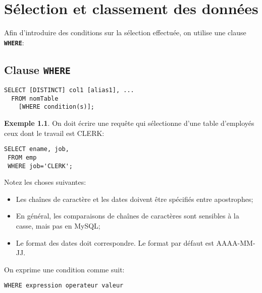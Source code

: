 \documentclass[a4paper, 12pt]{report}
\newcommand{\textSQL}[1]{\texttt{\textbf{#1}}}
\theoremstyle{definition} \newtheorem{ex}{Exemple}
\begin{document}
\chapter{Sélection et classement des données}
Afin d'introduire des conditions sur la sélection effectuée, on utilise une clause \textSQL{WHERE}:
\section{Clause \textSQL{WHERE}}
\begin{lstlisting}[frame=single]
SELECT [DISTINCT] col1 [alias1], ...
  FROM nomTable
	[WHERE condition(s)];
\end{lstlisting}

\begin{ex}
On doit écrire une requête qui sélectionne d'une table d'employés ceux dont le travail est CLERK:
\begin{lstlisting}[frame=single]
SELECT ename, job,
 FROM emp
 WHERE job='CLERK';
\end{lstlisting}
\end{ex}

Notez les choses suivantes: \begin{itemize}%
\item Les chaînes de caractère et les dates doivent être spécifiés entre apostrophes;
\item En général, les comparaisons de chaînes de caractères sont sensibles à la casse, mais pas en MySQL;
\item Le format des dates doit correspondre. Le format par défaut est AAAA-MM-JJ.
\end{itemize}

On exprime une condition comme suit: 
\begin{lstlisting}[frame=single]
WHERE expression operateur valeur 
\end{lstlisting}
\end{document}
